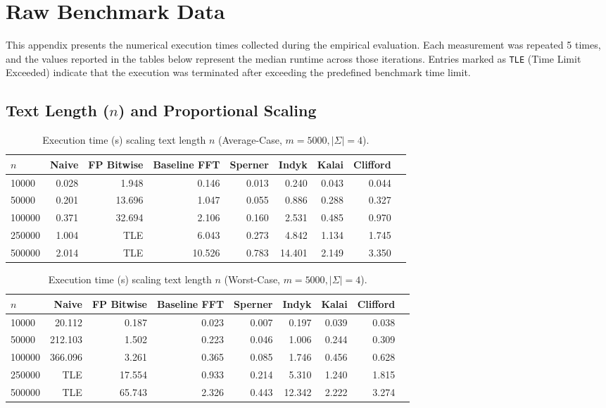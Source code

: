 \appendix
\chapter{Raw Benchmark Data}
\label{sec:appendix_data}

This appendix presents the numerical execution times collected during the empirical evaluation. Each measurement was repeated 5 times, and the values reported in the tables below represent the median runtime across those iterations. Entries marked as \texttt{TLE} (Time Limit Exceeded) indicate that the execution was terminated after exceeding the predefined benchmark time limit.

\section{Text Length ($n$) and Proportional Scaling}

\begin{table}[H]
\centering
\caption{Execution time (s) scaling text length $n$ (Average-Case, $m=5000, |\Sigma|=4$).}
\label{tab:mean_n_data}
\begin{tabular}{@{}lrrrrrrrr@{}}
\toprule
$n$ & Naive & FP Bitwise & Baseline FFT & Sperner & Indyk & Kalai & Clifford \\
\midrule
10000  & 0.028 & 1.948 & 0.146 & 0.013 & 0.240 & 0.043 & 0.044 \\
50000  & 0.201 & 13.696 & 1.047 & 0.055 & 0.886 & 0.288 & 0.327 \\
100000 & 0.371 & 32.694 & 2.106 & 0.160 & 2.531 & 0.485 & 0.970 \\
250000 & 1.004 & {\footnotesize TLE}   & 6.043 & 0.273 & 4.842 & 1.134 & 1.745 \\
500000 & 2.014 & {\footnotesize TLE}   & 10.526 & 0.783 & 14.401 & 2.149 & 3.350 \\
\bottomrule
\end{tabular}
\end{table}

\begin{table}[H]
\centering
\caption{Execution time (s) scaling text length $n$ (Worst-Case, $m=5000, |\Sigma|=4$).}
\label{tab:worst_n_data}
\begin{tabular}{@{}lrrrrrrrr@{}}
\toprule
$n$ & Naive & FP Bitwise & Baseline FFT & Sperner & Indyk & Kalai & Clifford \\
\midrule
10000  & 20.112 & 0.187 & 0.023 & 0.007 & 0.197 & 0.039 & 0.038 \\
50000  & 212.103 & 1.502 & 0.223 & 0.046 & 1.006 & 0.244 & 0.309 \\
100000 & 366.096 & 3.261 & 0.365 & 0.085 & 1.746 & 0.456 & 0.628 \\
250000 & {\footnotesize TLE}    & 17.554   & 0.933 & 0.214 & 5.310 & 1.240 & 1.815 \\
500000 & {\footnotesize TLE}    & 65.743   & 2.326 & 0.443 & 12.342 & 2.222 & 3.274 \\
\bottomrule
\end{tabular}
\end{table}


